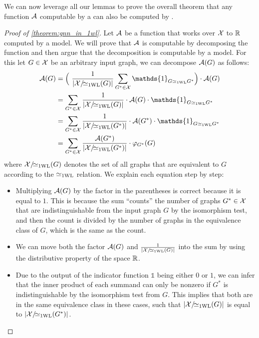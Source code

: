 We can now leverage all our lemmas to prove the overall theorem that any function $\mathcal{A}$ computable by a \gnn can also be computed by \wlnn.
\begin{proof}[Proof of \cref{theorem:gnn_in_1wl}]\label{prof:gnn_in_1wl}
    Let $\mathcal{A}$ be a function that works over $\mathcal{X}$ to $\mathbb{R}$ computed by a \gnn model. We will prove that $\mathcal{A}$ is \wlnn computable by decomposing the function and then argue that the decomposition is computable by a \wlnn model. For this let $G \in \mathcal{X}$ be an arbitrary input graph, we can decompose $\mathcal{A}(G)$ as follows:
    \begin{align}
        \mathcal{A}(G) &= \Bigl( \ \frac{1}{|\cX/\!{\wliso}(G)|}\sum_{G^* \in \cX} \mathds{1}_{G \wliso G^*} \Bigr) \cdot \mathcal{A}(G) \label{eq:gnn_decomposition1}\\
        &= \sum_{G^* \in \cX} \frac{1}{|\cX/\!{\wliso}(G)|} \cdot \mathcal{A}(G) \cdot \mathds{1}_{G \wliso G^*} \label{eq:gnn_decomposition2}\\
        &= \sum_{G^* \in \cX} \frac{1}{|\cX/\!{\wliso}(G^*)|} \cdot \mathcal{A}(G^*) \cdot \mathds{1}_{G \wliso G^*} \label{eq:gnn_decomposition3}\\
        &= \sum_{G^* \in \cX} \frac{\mathcal{A}(G^*)}{|\cX/\!{\wliso}(G^*)|}  \cdot \varphi_{G^*}(G) \label{eq:gnn_decomposition4}
    \end{align}
    where $\mathcal{X}/\!{\simeq_{\text{1WL}}}(G)$ denotes the set of all graphs that are equivalent to $G$ according to the $\simeq_{\text{1WL}}$ relation. We explain each equation step by step:
    \begin{itemize}[leftmargin=9em]
        \item[\cref*{eq:gnn_decomposition1}:] Multiplying $\mathcal{A}(G)$ by the factor in the parentheses is correct because it is equal to $1$. This is because the sum ``counts'' the number of graphs $G^* \in \mathcal{X}$ that are indistinguishable from the input graph $G$ by the \wl isomorphism test, and then the count is divided by the number of graphs in the equivalence class of $G$, which is the same as the count.
        \item[\cref*{eq:gnn_decomposition2}:] We can move both the factor $\mathcal{A}(G)$ and $\frac{1}{|\mathcal{X}/\!{\simeq_{\text{1WL}}}(G)|}$ into the sum by using the distributive property of the space $\mathbb{R}$.     
        \item[\cref*{eq:gnn_decomposition3}:] Due to the output of the indicator function $\mathds{1}$ being either $0$ or $1$, we can infer that the inner product of each summand can only be nonzero if $G^*$ is indistinguishable by the \wl isomorphism test from $G$. This implies that both are in the same equivalence class in these cases, such that $|\mathcal{X}/\!{\simeq_{\text{1WL}}}(G)|$ is equal to $|\mathcal{X}/\!{\simeq_{\text{1WL}}}(G^*)|$.\\

\end{itemize}
\end{proof}
